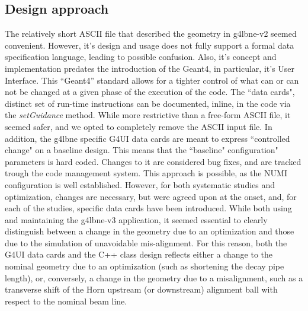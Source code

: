 \subsection{Design approach}  The relatively short ASCII file that described the geometry in g4lbne-v2 seemed convenient. However, it's design and usage does not fully support a formal  data specification language, leading to possible confusion. Also, it's concept and implementation predates the introduction of the Geant4, in particular,  it's User Interface. This ``Geant4'' standard allows for a tighter control of what can or can not be changed at a given phase of the execution of the code.  The ``data cards", distinct set of run-time instructions can be documented, inline, in the code via the {\em setGuidance} method. While more restrictive than a  free-form ASCII file, it seemed safer, and we opted to completely remove the ASCII input file.     In addition, the g4lbne specific G4UI data cards are meant to express ``controlled change" on a baseline design. This means that the ``baseline"   configuration" parameters is hard coded.  Changes to it are considered bug fixes, and are tracked trough the code management system. This approach is  possible, as the NUMI configuration is well established. However, for both systematic studies and optimization, changes are necessary, but were agreed upon  at the onset, and, for each of the studies, specific data cards have been introduced.     While both using and maintaining the g4lbne-v3 application, it seemed essential to clearly distinguish between a change in the geometry due to an  optimization and those due to the simulation of unavoidable mis-alignment. For this reason, both the G4UI data cards and the C++ class design reflects either  a change to the nominal geometry due to an optimization (such as shortening the decay pipe length), or, conversely, a change in the geometry due to a  misalignment, such as a transverse shift of the Horn upstream (or downstream) alignment ball with respect to the nominal beam line. 

